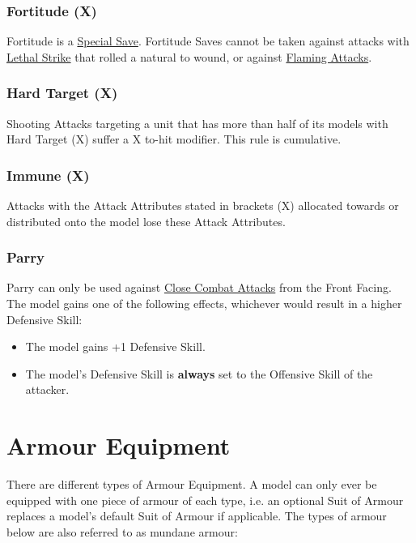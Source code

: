 \subsubsection{Fortitude (X)}
\idx[main=y]{\fortitude{}}\label{fortitude}

Fortitude is a \hyperref[special_saves]{Special Save}. Fortitude Saves cannot be taken against attacks with \hyperref[lethal_strike]{Lethal Strike} that rolled a natural  to wound, or against \hyperref[flaming_attacks]{Flaming Attacks}.

\subsubsection{Hard Target (X)}
\idx[main=y]{\hardtarget}\label{hard_target}

Shooting Attacks targeting a unit that has more than half of its models with Hard Target (X) suffer a \minuss{}X to-hit modifier. This rule is cumulative.

\subsubsection{Immune (X)}
\idx[main=y]{\immune}\label{immune}

Attacks with the Attack Attributes stated in brackets (X) allocated towards or distributed onto the model lose these Attack Attributes.

\subsubsection{Parry}
\idx[main=y]{\parry}\label{parry}

Parry can only be used against \hyperref[melee_attacks]{Close Combat Attacks} from the Front Facing. The model gains one of the following effects, whichever would result in a higher Defensive Skill:
\begin{itemize}
	\item The model gains +1 Defensive Skill.
	\item The model's Defensive Skill is \textbf{always} set to the Offensive Skill of the attacker.
\end{itemize}

\section{Armour Equipment}
\label{armour_equipment}

There are different types of Armour Equipment. A model can only ever be equipped with one piece of armour of each type, i.e. an optional Suit of Armour replaces a model's default Suit of Armour if applicable. The types of armour below are also referred to as mundane armour:

